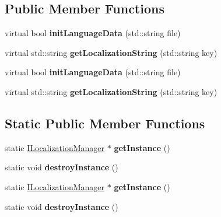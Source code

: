 \subsection*{Public Member Functions}
\begin{DoxyCompactItemize}
\item 
\mbox{\label{classcocostudio_1_1JsonLocalizationManager_a46832df5af17d108b70c0df09db3238d}} 
virtual bool {\bfseries init\+Language\+Data} (std\+::string file)
\item 
\mbox{\label{classcocostudio_1_1JsonLocalizationManager_a8c221c0e573dd89c09d17f9016ab661e}} 
virtual std\+::string {\bfseries get\+Localization\+String} (std\+::string key)
\item 
\mbox{\label{classcocostudio_1_1JsonLocalizationManager_a2338cb656cc0bdd5719b0787b29f5a0d}} 
virtual bool {\bfseries init\+Language\+Data} (std\+::string file)
\item 
\mbox{\label{classcocostudio_1_1JsonLocalizationManager_a89f8be609eafa1322e349c24a77b19dc}} 
virtual std\+::string {\bfseries get\+Localization\+String} (std\+::string key)
\end{DoxyCompactItemize}
\subsection*{Static Public Member Functions}
\begin{DoxyCompactItemize}
\item 
\mbox{\label{classcocostudio_1_1JsonLocalizationManager_a375caee0de5ea4da5a59d281bdedb2ec}} 
static \hyperlink{classcocostudio_1_1ILocalizationManager}{I\+Localization\+Manager} $\ast$ {\bfseries get\+Instance} ()
\item 
\mbox{\label{classcocostudio_1_1JsonLocalizationManager_ad1ce16dd3c7d23f749115e8c99ad44ac}} 
static void {\bfseries destroy\+Instance} ()
\item 
\mbox{\label{classcocostudio_1_1JsonLocalizationManager_a538a8b9a0563be90af83da46b22bc019}} 
static \hyperlink{classcocostudio_1_1ILocalizationManager}{I\+Localization\+Manager} $\ast$ {\bfseries get\+Instance} ()
\item 
\mbox{\label{classcocostudio_1_1JsonLocalizationManager_a5f9b25e4d6b9873ab1bb6ce1684dd0a8}} 
static void {\bfseries destroy\+Instance} ()
\end{DoxyCompactItemize}
